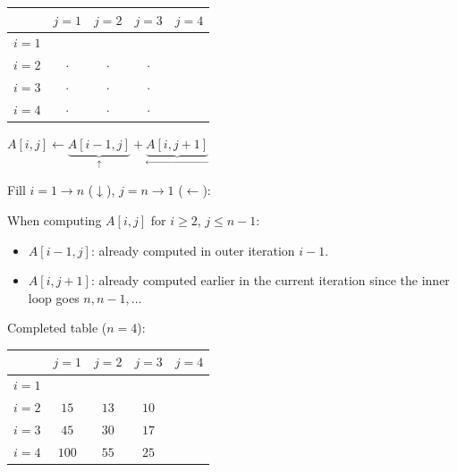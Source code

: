 \documentclass[11pt]{article}
\newcommand{\bc}[1]{\cellcolor{gray!20}{#1}}
\begin{document}
\begin{center}
\renewcommand{\arraystretch}{1.3}
\begin{tabular}{c|cccc}
 & $j{=}1$ & $j{=}2$ & $j{=}3$ & $j{=}4$ \\ \hline
$i{=}1$ & \bc{$2$} & \bc{$3$} & \bc{$4$} & \bc{$5$} \\
$i{=}2$ & $\cdot$ & $\cdot$ & $\cdot$ & \bc{$6$} \\
$i{=}3$ & $\cdot$ & $\cdot$ & $\cdot$ & \bc{$7$} \\
$i{=}4$ & $\cdot$ & $\cdot$ & $\cdot$ & \bc{$8$}
\end{tabular}
\qquad
$A[i,j] \longleftarrow \underbrace{A[i{-}1,j]}_{\uparrow} + \underbrace{A[i,j{+}1]}_{\leftarrow}$
\end{center}

Fill $i = 1 \to n$ ($\downarrow$), \; $j = n \to 1$ ($\leftarrow$):

\begin{algorithm}[H]
\DontPrintSemicolon
{}
\end{algorithm}

When computing $A[i, j]$ for $i \ge 2$, $j \le n{-}1$:
\begin{itemize}[nosep]
\item $A[i{-}1, j]$: already computed in outer iteration $i{-}1$.
\item $A[i, j{+}1]$: already computed earlier in the current iteration since the inner loop goes $n, n{-}1, \ldots$
\end{itemize}

Completed table ($n = 4$):

\begin{center}
\renewcommand{\arraystretch}{1.3}
\begin{tabular}{c|cccc}
 & $j{=}1$ & $j{=}2$ & $j{=}3$ & $j{=}4$ \\ \hline
$i{=}1$ & \bc{$2$} & \bc{$3$} & \bc{$4$} & \bc{$5$} \\
$i{=}2$ & $15$ & $13$ & $10$ & \bc{$6$} \\
$i{=}3$ & $45$ & $30$ & $17$ & \bc{$7$} \\
$i{=}4$ & $100$ & $55$ & $25$ & \bc{$8$}
\end{tabular}
\end{center}
\end{document}
